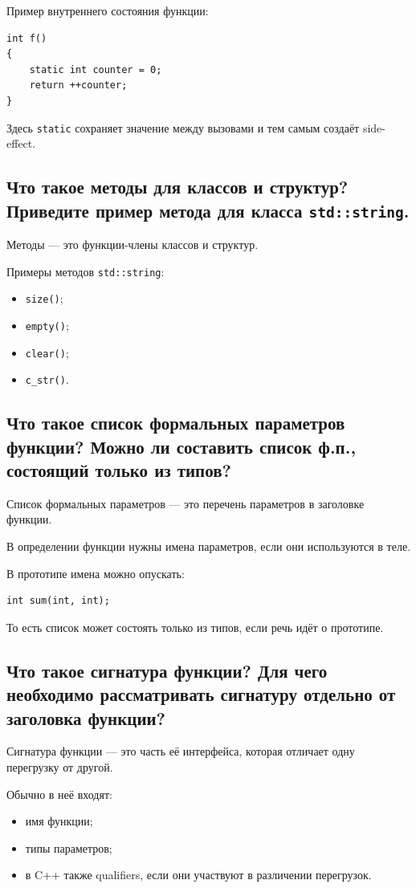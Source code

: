 Пример внутреннего состояния функции:
\begin{verbatim}
int f()
{
    static int counter = 0;
    return ++counter;
}
\end{verbatim}

Здесь \texttt{static} сохраняет значение между вызовами и тем самым создаёт side-effect.


\subsection{Что такое методы для классов и структур? Приведите пример метода для класса \texttt{std::string}.}

Методы --- это функции-члены классов и структур.

Примеры методов \texttt{std::string}:
\begin{itemize}
    \item \texttt{size()};
    \item \texttt{empty()};
    \item \texttt{clear()};
    \item \texttt{c\_str()}.
\end{itemize}


\subsection{Что такое список формальных параметров функции? Можно ли составить список ф.п., состоящий только из типов?}

Список формальных параметров --- это перечень параметров в заголовке функции.

В определении функции нужны имена параметров, если они используются в теле.

В прототипе имена можно опускать:
\begin{verbatim}
int sum(int, int);
\end{verbatim}

То есть список может состоять только из типов, если речь идёт о прототипе.


\subsection{Что такое сигнатура функции? Для чего необходимо рассматривать сигнатуру отдельно от заголовка функции?}

Сигнатура функции --- это часть её интерфейса, которая отличает одну перегрузку от другой.

Обычно в неё входят:
\begin{itemize}
    \item имя функции;
    \item типы параметров;
    \item в C++ также qualifiers, если они участвуют в различении перегрузок.
\end{itemize}

